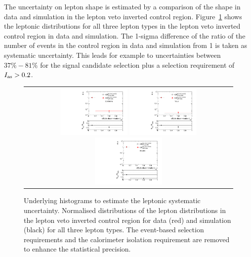 The uncertainty on lepton \ias shape is estimated by a comparison of the \ias shape in data and simulation in the lepton veto inverted control region.
Figure~\ref{fig:LeptonIasUnc} shows the leptonic \ias distributions for all three lepton types in the lepton veto inverted control region in data and simulation.
The 1-sigma difference of the ratio of the number of events in the control region in data and simulation from 1 is taken as systematic uncertainty.
This leads for example to uncertainties between $37\%-81\%$ for the signal candidate selection plus a selection requirement of $I_{\text{as}}>0.2$.
\begin{figure}[!h]
  \centering 
  \begin{tabular}{c}
    \includegraphics[width=0.33\textwidth]{figures/analysis/Background/hASmi_SRbinning_Electrons_MCCR_DataCR.pdf}
    \includegraphics[width=0.33\textwidth]{figures/analysis/Background/hASmi_SRbinning_Taus_MCCR_DataCR.pdf}
    \includegraphics[width=0.33\textwidth]{figures/analysis/Background/hASmi_SRbinning_Muons_MCCR_DataCR.pdf}
  \end{tabular}
  \caption{Underlying histograms to estimate the leptonic \ias systematic uncertainty. Normalised distributions of the lepton \ias distributions in the lepton veto inverted control region for data (red) and simulation (black) for all three lepton types. The event-based selection requirements and the calorimeter isolation requirement are removed to enhance the statistical precision.}
  \label{fig:LeptonIasUnc}
\end{figure}

